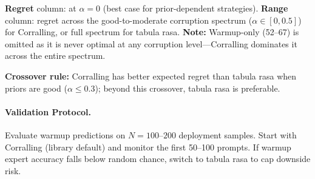 \begin{table}[htbp]
\centering
\caption{%
    \textbf{Deployment Strategy Selection Guide.}
    Regret at $\alpha{=}0$ (correct priors) and typical ranges across the
    corruption spectrum from the     1{,}483-prompt holdout evaluation
    ($N{=}20$ seeds, Corralling with $w_0{=}0.7$, hybrid LinUCB).
    \textbf{Key insight:} the crossover at $\alpha{\approx}0.3$
    determines when Corralling's variance exceeds its benefit
    (see the prior degradation sweep plot above).
}
\small
{}

\vspace{0.5em}
\small
\textbf{Regret} column: at $\alpha{=}0$ (best case for prior-dependent strategies).
\textbf{Range} column: regret across the good-to-moderate corruption
spectrum ($\alpha \in [0, 0.5]$) for Corralling, or full spectrum for
tabula rasa.
\textbf{Note:} Warmup-only (52--67) is omitted as it is never optimal at
any corruption level---Corralling dominates it across the entire spectrum.

\textbf{Crossover rule:}
Corralling has better expected regret than tabula rasa when
priors are good ($\alpha \leq 0.3$); beyond this crossover,
tabula rasa is preferable.
\end{table}

\paragraph{Validation Protocol.}
Evaluate warmup predictions on $N=100$--$200$ deployment samples.
Start with Corralling (library default) and monitor the first 50--100
prompts.  If warmup expert accuracy falls below random chance, switch to
tabula rasa to cap downside risk.

